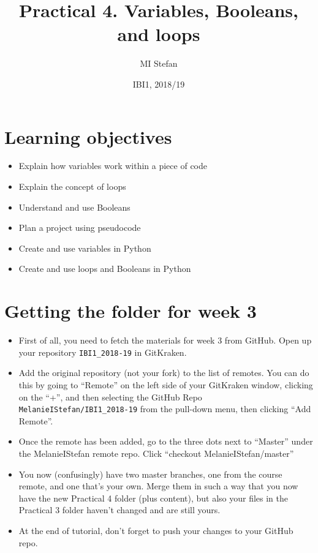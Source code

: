 \documentclass[pdflatex,a4paper]{article}
\title{Practical 4. Variables, Booleans, and loops}
\author{MI Stefan}
\date{IBI1, 2018/19}
\begin{document}
\newcommand{\<}{\textless}
\renewcommand{\>}{\textgreater}


\maketitle

\section{Learning objectives}

\begin{itemize}
\item
Explain how variables work within a piece of code
\item
Explain the concept of loops
\item
Understand and use Booleans
\item
Plan a project using pseudocode
\item
Create and use variables in Python 
\item
Create and use loops and Booleans in Python
\end{itemize}

\section{Getting the folder for week 3}

\begin{itemize}
\item
First of all, you need to fetch the materials for week 3 from GitHub. Open up your repository \verb=IBI1_2018-19= in GitKraken.
\item
Add the original repository (not your fork) to the list of remotes. You can do this by going to ``Remote'' on the left side of your GitKraken window, clicking on the ``+'', and then selecting the GitHub Repo \verb=MelanieIStefan/IBI1_2018-19= from the pull-down menu, then clicking ``Add Remote''. 
\item
Once the remote has been added, go to the three dots next to ``Master'' under the MelanieIStefan remote repo. Click ``checkout MelanieIStefan/master''
\item
You now (confusingly) have two master branches, one from the course remote, and one that's your own. Merge them in such a way that you now have the new Practical 4 folder (plus content), but also your files in the Practical 3 folder haven't changed and are still yours.
\item
At the end of tutorial, don't forget to push your changes to your GitHub repo. 
\end{itemize}
\end{document}
